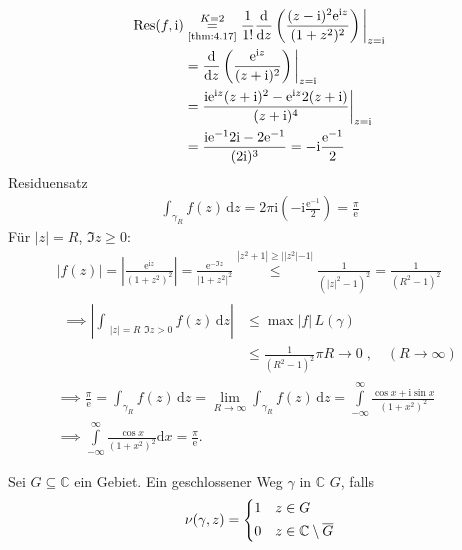 \documentclass[a4paper,10pt]{scrbook}
\begin{document}
\begin{example}
\begin{enum-arab}
\begin{align*}
      \mathrm{Res}(f,\mathrm{i})
      &\overset{K=2}{\underset{\text{\ref{thm:4.17}}}{=}} \frac{1}{1!} \frac{\mathrm{d}}{\mathrm{d}z} \left( \frac{(z-\mathrm{i})^2 \mathrm{e}^{\mathrm{i}z}}{(1+z^2)^2} \right) \bigg|_{z = \mathrm{i}} \\
      &= \frac{\mathrm{d}}{\mathrm{d}z} \left( \frac{\mathrm{e}^{\mathrm{i}z}}{(z + \mathrm{i})^2} \right) \bigg|_{z = \mathrm{i}} \\
      &= \frac{\mathrm{i} \mathrm{e}^{\mathrm{i}z} (z+\mathrm{i})^2 - \mathrm{e}^{\mathrm{i}z} 2 (z+\mathrm{i})}{(z+\mathrm{i})^4}  \bigg|_{z = \mathrm{i}} \\
      &= \frac{\mathrm{i} \mathrm{e}^{-1} 2 \mathrm{i} - 2 \mathrm{e}^{-1}}{(2\mathrm{i})^3} = - \mathrm{i} \frac{\mathrm{e}^{-1}}{2}
    \end{align*}
    Residuensatz
    \begin{align*}
      \int_{\gamma_R} f(z) \, \mathrm{d}z = 2 \pi \mathrm{i} \left( - \mathrm{i} \frac{\mathrm{e}^{-1}}{2} \right) = \frac{\pi}{\mathrm{e}}
    \end{align*}
    Für $|z| = R$, $\Im z \geq 0$:
    \begin{gather*}
      |f(z)| = \left| \frac{\mathrm{e}^{\mathrm{i}z}}{(1+z^2)^2} \right| = \frac{\mathrm{e}^{-\Im z}}{|1+z^2|^2} \overset{|z^2+1|\geq||z^2|-1|}{\leq} \frac{1}{(|z|^2 - 1)^2} = \frac{1}{(R^2 - 1)^2} \\
      \begin{aligned}
        \implies \left| \int_{\substack{|z|=R}{\Im z > 0}} f(z) \, \mathrm{d}z \right|
        &\leq \max |f| \, L(\gamma) \\
        &\leq \frac{1}{(R^2 - 1)^2} \pi R \to 0 \; , \quad (R \to \infty)
      \end{aligned} \\
      \implies \frac{\pi}{\mathrm{e}} = \int_{\gamma_R} f(z) \, \mathrm{d}z = \lim\limits_{R \to \infty} \int_{\gamma_R} f(z) \, \mathrm{d}z = \int\limits_{-\infty}^{\infty} \frac{\cos x + \mathrm{i} \sin x}{(1+x^2)^2} \\
      \implies \int\limits_{-\infty}^{\infty} \frac{\cos x}{(1+x^2)^2} \mathrm{d}x = \frac{\pi}{\mathrm{e}} .
    \end{gather*}
  \end{enum-arab}
\end{example}

\begin{theorem}[Definition] \label{thm:4.19}
  Sei $G \subseteq \mathbb{C}$ ein Gebiet. Ein geschlossener Weg $\gamma$ in $\mathbb{C}$  $G$, falls
  \begin{align*}
    \nu(\gamma,z) =
    \begin{dcases}
      1 & z \in G \\
      0 & z \in \mathbb{C}\setminus \overline{G}
    \end{dcases}
  \end{align*}
\end{theorem}
\end{document}
